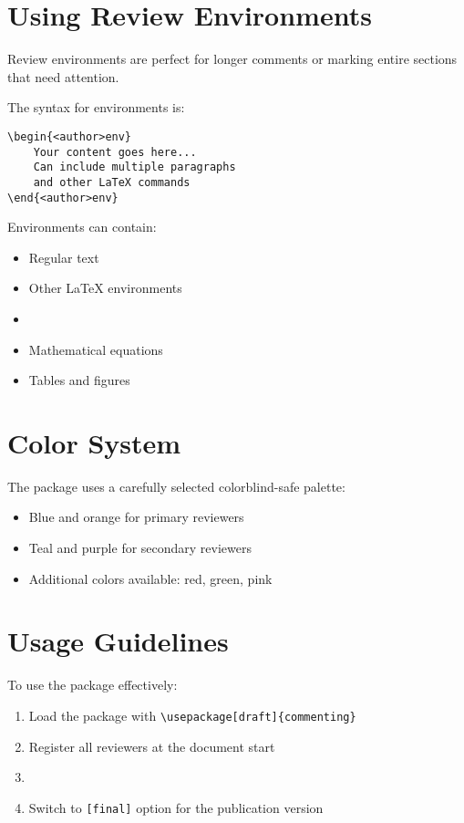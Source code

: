 \documentclass{article}
\begin{document}
\section{Using Review Environments}
Review environments are perfect for longer comments or marking entire sections that need 
attention.

\begin{aliceenv}
The syntax for environments is:

\begin{verbatim}
\begin{<author>env}
    Your content goes here...
    Can include multiple paragraphs
    and other LaTeX commands
\end{<author>env}
\end{verbatim}
\end{aliceenv}

\begin{bobenv}
Environments can contain:
\begin{itemize}
    \item Regular text
    \item Other LaTeX environments
    \item {}
    \item Mathematical equations
    \item Tables and figures
\end{itemize}
\end{bobenv}

\section{Color System}
The package uses a carefully selected colorblind-safe palette:

\begin{itemize}
    \item \textcolor{cbBlue}{Blue} and \textcolor{cbOrange}{orange} for primary reviewers
    \item \textcolor{cbTeal}{Teal} and \textcolor{cbPurple}{purple} for secondary reviewers
    \item Additional colors available: \textcolor{cbRed}{red}, \textcolor{cbGreen}{green}, 
    \textcolor{cbPink}{pink}
\end{itemize}

\section{Usage Guidelines}
To use the package effectively:
\begin{enumerate}
    \item Load the package with \verb|\usepackage[draft]{commenting}|
    \item Register all reviewers at the document start
    \item {}
    \item Switch to \verb|[final]| option for the publication version
\end{enumerate}
\end{document}
